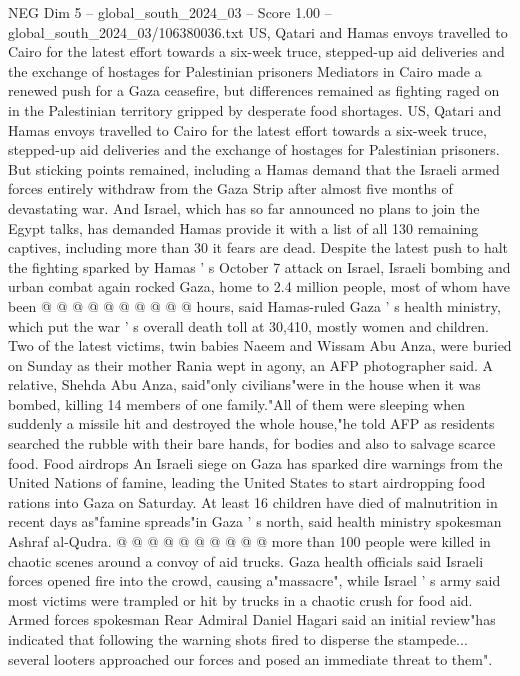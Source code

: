 \begin{textsample}{NEG Dim 5 – global\_south\_2024\_03 – Score 1.00 – global\_south\_2024\_03/106380036.txt}  \label{ex:f5_neg_316}
US, Qatari and Hamas envoys travelled to Cairo for the latest effort towards a six-week truce, stepped-up aid deliveries and the exchange of hostages for Palestinian prisoners Mediators in Cairo made a renewed push for a Gaza ceasefire, but differences remained as fighting raged on in the Palestinian territory gripped by desperate food shortages.
US, Qatari and Hamas envoys travelled to Cairo for the latest effort towards a six-week truce, stepped-up aid deliveries and the exchange of hostages for Palestinian prisoners.
But sticking points remained, including a Hamas demand that the Israeli armed forces entirely withdraw from the Gaza Strip after almost five months of devastating war.
And Israel, which has so far announced no plans to join the Egypt talks, has demanded Hamas provide it with a list of all 130 remaining captives, including more than 30 it fears are dead.
Despite the latest push to halt the fighting sparked by Hamas ' s October 7 attack on Israel, Israeli bombing and urban combat again rocked Gaza, home to 2.4 million people, most of whom have been @ @ @ @ @ @ @ @ @ @ hours, said Hamas-ruled Gaza ' s health ministry, which put the war ' s overall death toll at 30,410, mostly women and children.
Two of the latest victims, twin babies Naeem and Wissam Abu Anza, were buried on Sunday as their mother Rania wept in agony, an AFP photographer said.
A relative, Shehda Abu Anza, said"only civilians"were in the house when it was bombed, killing 14 members of one family."All of them were sleeping when suddenly a missile hit and destroyed the whole house,"he told AFP as residents searched the rubble with their bare hands, for bodies and also to salvage scarce food.
Food airdrops An Israeli siege on Gaza has sparked dire warnings from the United Nations of famine, leading the United States to start airdropping food rations into Gaza on Saturday.
At least 16 children have died of malnutrition in recent days as"famine spreads"in Gaza ' s north, said health ministry spokesman Ashraf al-Qudra. @ @ @ @ @ @ @ @ @ @ more than 100 people were killed in chaotic scenes around a convoy of aid trucks.
Gaza health officials said Israeli forces opened fire into the crowd, causing a"massacre", while Israel ' s army said most victims were trampled or hit by trucks in a chaotic crush for food aid.
Armed forces spokesman Rear Admiral Daniel Hagari said an initial review"has indicated that following the warning shots fired to disperse the stampede... several looters approached our forces and posed an immediate threat to them".

\end{textsample}
